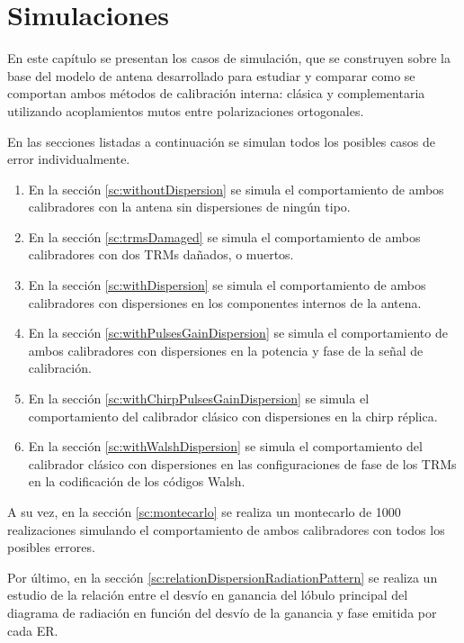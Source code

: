 \chapter{Simulaciones}
\label{ch:simulations}


En este capítulo se presentan los casos de simulación, que se construyen sobre la base del modelo de antena desarrollado para
estudiar y comparar como se comportan ambos métodos de calibración interna: clásica y complementaria utilizando acoplamientos
mutos entre polarizaciones ortogonales.

En las secciones listadas a continuación se simulan todos los posibles casos de error individualmente.
\begin{enumerate}
	\item En la sección \ref{sc:withoutDispersion} se simula el comportamiento de ambos calibradores con la antena sin
		dispersiones de ningún tipo.
	\item En la sección \ref{sc:trmsDamaged} se simula el comportamiento de ambos calibradores con dos TRMs dañados, o muertos.
	\item En la sección \ref{sc:withDispersion} se simula el comportamiento de ambos calibradores con dispersiones en los
		componentes internos de la antena.
	\item En la sección \ref{sc:withPulsesGainDispersion} se simula el comportamiento de ambos calibradores con dispersiones en
		la potencia y fase de la señal de calibración.
	\item En la sección \ref{sc:withChirpPulsesGainDispersion} se simula el comportamiento del calibrador clásico con 
		dispersiones en la chirp réplica. 
	\item En la sección \ref{sc:withWalshDispersion} se simula el comportamiento del calibrador clásico con dispersiones en las
		configuraciones de fase de los TRMs en la codificación de los códigos Walsh.
\end{enumerate}

A su vez, en la sección \ref{sc:montecarlo} se realiza un montecarlo de 1000 realizaciones simulando el comportamiento de ambos
calibradores con todos los posibles errores. 

Por último, en la sección \ref{sc:relationDispersionRadiationPattern} se realiza un estudio de la relación entre el desvío en
ganancia del lóbulo principal del diagrama de radiación en función del desvío de la ganancia y fase emitida por cada ER.


